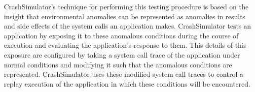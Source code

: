 CrashSimulator's technique for performing this testing procedure is based on the
insight that environmental anomalies can be represented as anomalies in results
and side effects of the system calls an application makes.  CrashSimulator tests
an application by exposing it to these anomalous conditions during the course of
execution and evaluating the application's response to them.  This details of
this exposure are configured by taking a system call trace of the application
under normal conditions and modifying it such that the anomalous conditions are
represented.  CrashSimulator uses these modified system call traces to control a
replay execution of the application in which these conditions will be encountered.





